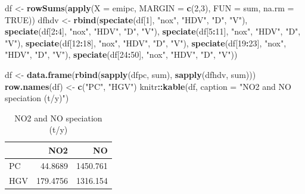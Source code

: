 \documentclass[12pt,graybox,envcountchap,sectrefs]{krantz}
\makeatletter
\newenvironment{Shaded}{\begin{snugshade}}{\end{snugshade}}
\newcommand{\KeywordTok}[1]{\textcolor[rgb]{0.13,0.29,0.53}{\textbf{#1}}}
\newcommand{\DataTypeTok}[1]{\textcolor[rgb]{0.13,0.29,0.53}{#1}}
\newcommand{\DecValTok}[1]{\textcolor[rgb]{0.00,0.00,0.81}{#1}}
\newcommand{\StringTok}[1]{\textcolor[rgb]{0.31,0.60,0.02}{#1}}
\newcommand{\OtherTok}[1]{\textcolor[rgb]{0.56,0.35,0.01}{#1}}
\newcommand{\OperatorTok}[1]{\textcolor[rgb]{0.81,0.36,0.00}{\textbf{#1}}}
\newcommand{\NormalTok}[1]{#1}
\newenvironment{kframe}{%
\medskip{}
\setlength{\fboxsep}{.8em}
 \def\at@end@of@kframe{}%
 \ifinner\ifhmode%
  \def\at@end@of@kframe{\end{minipage}}%
  \begin{minipage}{\columnwidth}%
 \fi\fi%
 \def\FrameCommand##1{\hskip\@totalleftmargin \hskip-\fboxsep
 \colorbox{shadecolor}{##1}\hskip-\fboxsep
     \hskip-\linewidth \hskip-\@totalleftmargin \hskip\columnwidth}%
 \MakeFramed {\advance\hsize-\width
   \@totalleftmargin\z@ \linewidth\hsize
   \@setminipage}}%
 {\par\unskip\endMakeFramed%
 \at@end@of@kframe}
\renewenvironment{Shaded}{\begin{kframe}}{\end{kframe}}
\theoremstyle{definition}
\theoremstyle{definition}
\theoremstyle{definition}
\theoremstyle{remark}
\makeatother
\begin{document}
\begin{Shaded}
\begin{Highlighting}[]
\NormalTok{df <-}\StringTok{ }\KeywordTok{rowSums}\NormalTok{(}\KeywordTok{apply}\NormalTok{(}\DataTypeTok{X =}\NormalTok{ emipc, }\DataTypeTok{MARGIN =} \KeywordTok{c}\NormalTok{(}\DecValTok{2}\NormalTok{,}\DecValTok{3}\NormalTok{), }\DataTypeTok{FUN =}\NormalTok{ sum, }\DataTypeTok{na.rm =} \OtherTok{TRUE}\NormalTok{))}
\NormalTok{dfhdv <-}\StringTok{   }\KeywordTok{rbind}\NormalTok{(}\KeywordTok{speciate}\NormalTok{(df[}\DecValTok{1}\NormalTok{], }\StringTok{"nox"}\NormalTok{, }\StringTok{"HDV"}\NormalTok{, }\StringTok{"D"}\NormalTok{, }\StringTok{"V"}\NormalTok{),}
                 \KeywordTok{speciate}\NormalTok{(df[}\DecValTok{2}\OperatorTok{:}\DecValTok{4}\NormalTok{], }\StringTok{"nox"}\NormalTok{, }\StringTok{"HDV"}\NormalTok{, }\StringTok{"D"}\NormalTok{, }\StringTok{"V"}\NormalTok{),}
                 \KeywordTok{speciate}\NormalTok{(df[}\DecValTok{5}\OperatorTok{:}\DecValTok{11}\NormalTok{], }\StringTok{"nox"}\NormalTok{, }\StringTok{"HDV"}\NormalTok{, }\StringTok{"D"}\NormalTok{, }\StringTok{"V"}\NormalTok{),}
                 \KeywordTok{speciate}\NormalTok{(df[}\DecValTok{12}\OperatorTok{:}\DecValTok{18}\NormalTok{], }\StringTok{"nox"}\NormalTok{, }\StringTok{"HDV"}\NormalTok{, }\StringTok{"D"}\NormalTok{, }\StringTok{"V"}\NormalTok{),}
                 \KeywordTok{speciate}\NormalTok{(df[}\DecValTok{19}\OperatorTok{:}\DecValTok{23}\NormalTok{], }\StringTok{"nox"}\NormalTok{, }\StringTok{"HDV"}\NormalTok{, }\StringTok{"D"}\NormalTok{, }\StringTok{"V"}\NormalTok{),}
                 \KeywordTok{speciate}\NormalTok{(df[}\DecValTok{24}\OperatorTok{:}\DecValTok{50}\NormalTok{], }\StringTok{"nox"}\NormalTok{, }\StringTok{"HDV"}\NormalTok{, }\StringTok{"D"}\NormalTok{, }\StringTok{"V"}\NormalTok{))}

\NormalTok{df <-}\StringTok{ }\KeywordTok{data.frame}\NormalTok{(}\KeywordTok{rbind}\NormalTok{(}\KeywordTok{sapply}\NormalTok{(dfpc, sum), }\KeywordTok{sapply}\NormalTok{(dfhdv, sum)))}
\KeywordTok{row.names}\NormalTok{(df) <-}\StringTok{ }\KeywordTok{c}\NormalTok{(}\StringTok{"PC"}\NormalTok{, }\StringTok{"HGV"}\NormalTok{)}
\NormalTok{knitr}\OperatorTok{::}\KeywordTok{kable}\NormalTok{(df, }\DataTypeTok{caption =} \StringTok{"NO2 and NO speciation (t/y)"}\NormalTok{)}
\end{Highlighting}
\end{Shaded}

\begin{table}

\caption{\label{tab:sno2}NO2 and NO speciation (t/y)}
\centering
\begin{tabular}[t]{l|r|r}
\hline
  & NO2 & NO\\
\hline
PC & 44.8689 & 1450.761\\
\hline
HGV & 179.4756 & 1316.154\\
\hline
\end{tabular}
\end{table}
\end{document}
